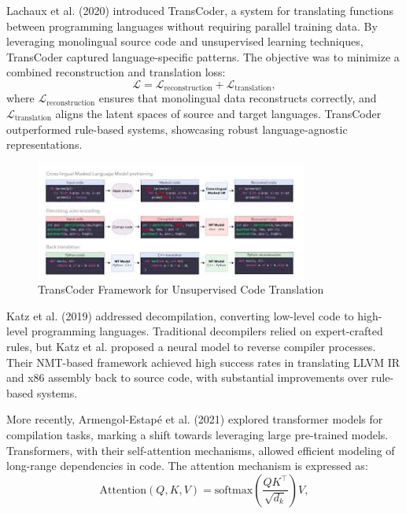 \documentclass{dhbenelux}
\begin{document}
Lachaux et al. (2020) introduced TransCoder, a system for translating functions between programming languages without requiring parallel training data. By leveraging monolingual source code and unsupervised learning techniques, TransCoder captured language-specific patterns. The objective was to minimize a combined reconstruction and translation loss:
\begin{equation}
\mathcal{L} = \mathcal{L}_{\text{reconstruction}} + \mathcal{L}_{\text{translation}},
\end{equation}
where \( \mathcal{L}_{\text{reconstruction}} \) ensures that monolingual data reconstructs correctly, and \( \mathcal{L}_{\text{translation}} \) aligns the latent spaces of source and target languages. TransCoder outperformed rule-based systems, showcasing robust language-agnostic representations.

\begin{figure}[h]
    \centering
    \includegraphics[width=0.8\textwidth]{Images/4.jpg}
    \caption{TransCoder Framework for Unsupervised Code Translation}
    \label{fig:transcoder}
\end{figure}

Katz et al. (2019) addressed decompilation, converting low-level code to high-level programming languages. Traditional decompilers relied on expert-crafted rules, but Katz et al. proposed a neural model to reverse compiler processes. Their NMT-based framework achieved high success rates in translating LLVM IR and x86 assembly back to source code, with substantial improvements over rule-based systems. 

More recently, Armengol-Estapé et al. (2021) explored transformer models for compilation tasks, marking a shift towards leveraging large pre-trained models. Transformers, with their self-attention mechanisms, allowed efficient modeling of long-range dependencies in code. The attention mechanism is expressed as:
\begin{equation}
\text{Attention}(Q, K, V) = \text{softmax}\left(\frac{QK^\top}{\sqrt{d_k}}\right)V,
\end{equation}
\end{document}
